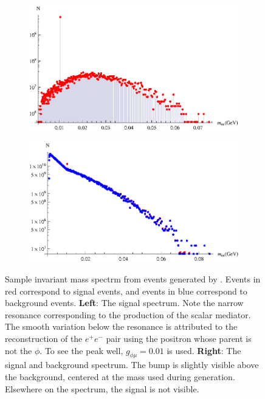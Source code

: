 \begin{figure}[t]
    \centering
    \begin{subfigure}[b]{0.45\textwidth}
        \centering
        \includegraphics[width=\textwidth]{Figures/spectra/mu_eeenunu_scalar}
        \label{fig:mu_eeenunu_scalar_spectrum}
    \end{subfigure}
    \begin{subfigure}[b]{0.45\textwidth}
        \centering
        \includegraphics[width=\textwidth]{Figures/spectra/mu_eeenunu_scalar_background}
        \label{fig:mu_eeenunu_scalar_background_spectrum}
    \end{subfigure}
    \caption{Sample invariant mass spectrm from events generated by \madgraph. Events in red correspond to signal events, and events in blue correspond to background events.
            \textbf{Left}: The signal spectrum. Note the narrow resonance corresponding to the production of the scalar mediator. The smooth variation below the resonance is attributed to the reconstruction of the $e^+e^-$ pair using the positron whose parent is not the $\phi$. To see the peak well, $g_{\phi\mu} = 0.01$ is used.
            \textbf{Right}: The signal and background spectrum. The bump is slightly visible above the background, centered at the mass used during generation. Elsewhere on the spectrum, the signal is not visible.}
    \label{fig:mu_eeenunu_spectrum}
\end{figure}

